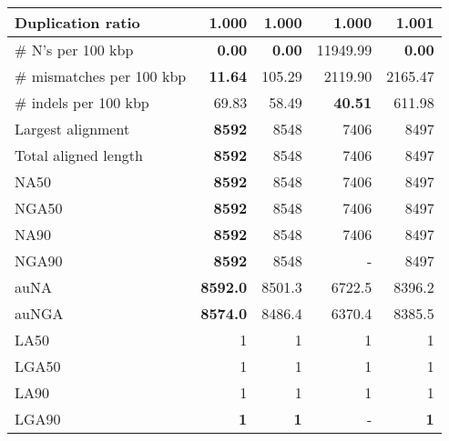 \documentclass[12pt,a4paper]{article}
\begin{document}
\begin{table}[ht]
\begin{center}
\begin{tabular}{|l*{4}{|r}|}
Duplication ratio & {\bf 1.000} & {\bf 1.000} & {\bf 1.000} & 1.001 \\ \hline
\# N's per 100 kbp & {\bf 0.00} & {\bf 0.00} & 11949.99 & {\bf 0.00} \\ \hline
\# mismatches per 100 kbp & {\bf 11.64} & 105.29 & 2119.90 & 2165.47 \\ \hline
\# indels per 100 kbp & 69.83 & 58.49 & {\bf 40.51} & 611.98 \\ \hline
Largest alignment & {\bf 8592} & 8548 & 7406 & 8497 \\ \hline
Total aligned length & {\bf 8592} & 8548 & 7406 & 8497 \\ \hline
NA50 & {\bf 8592} & 8548 & 7406 & 8497 \\ \hline
NGA50 & {\bf 8592} & 8548 & 7406 & 8497 \\ \hline
NA90 & {\bf 8592} & 8548 & 7406 & 8497 \\ \hline
NGA90 & {\bf 8592} & 8548 & - & 8497 \\ \hline
auNA & {\bf 8592.0} & 8501.3 & 6722.5 & 8396.2 \\ \hline
auNGA & {\bf 8574.0} & 8486.4 & 6370.4 & 8385.5 \\ \hline
LA50 & 1 & 1 & 1 & 1 \\ \hline
LGA50 & 1 & 1 & 1 & 1 \\ \hline
LA90 & 1 & 1 & 1 & 1 \\ \hline
LGA90 & {\bf 1} & {\bf 1} & - & {\bf 1} \\ \hline
\end{tabular}
\end{center}
\end{table}
\end{document}
